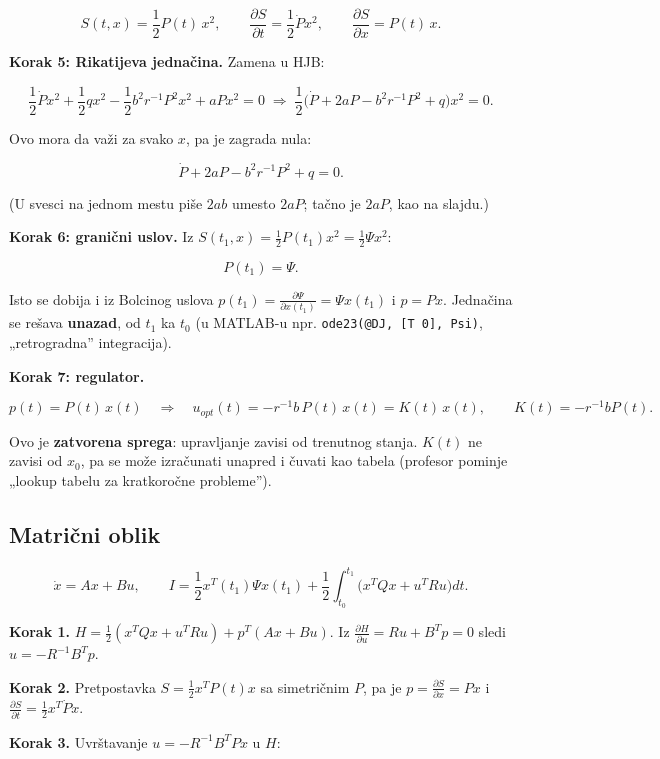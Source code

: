 \documentclass[11pt,a4paper,parskip=half,headsepline,numbers=noenddot]{scrartcl}
\begin{document}
\[S(t, x) = \frac12P(t)\,x^2, \qquad \frac{\partial S}{\partial t} = \frac12\dot P x^2, \qquad \frac{\partial S}{\partial x} = P(t)\,x .\]

\textbf{Korak 5: Rikatijeva jednačina.} Zamena u HJB:

\[\frac12\dot Px^2 + \frac12qx^2 - \frac12b^2r^{-1}P^2x^2 + aPx^2 = 0 \;\Rightarrow\; \frac12\big(\dot P + 2aP - b^2r^{-1}P^2 + q\big)x^2 = 0 .\]

Ovo mora da važi za svako \(x\), pa je zagrada nula:

\[\dot P + 2aP - b^2r^{-1}P^2 + q = 0 .\]

(U svesci na jednom mestu piše \(2ab\) umesto \(2aP\); tačno je \(2aP\), kao na slajdu.)

\textbf{Korak 6: granični uslov.} Iz \(S(t_1, x) = \frac12P(t_1)x^2 = \frac12\Psi x^2\):

\[P(t_1) = \Psi .\]

Isto se dobija i iz Bolcinog uslova \(p(t_1) = \frac{\partial\Psi}{\partial x(t_1)} = \Psi x(t_1)\) i \(p = Px\). Jednačina se rešava \textbf{unazad}, od \(t_1\) ka \(t_0\) (u MATLAB-u npr. \texttt{ode23(\allowbreak{}@DJ,\allowbreak{}\ {[}T\ 0{]},\allowbreak{}\ Psi)}, „retrogradna'' integracija).

\textbf{Korak 7: regulator.}

\[p(t) = P(t)\,x(t) \quad\Rightarrow\quad u_{opt}(t) = -r^{-1}b\,P(t)\,x(t) = K(t)\,x(t), \qquad K(t) = -r^{-1}bP(t) .\]

Ovo je \textbf{zatvorena sprega}: upravljanje zavisi od trenutnog stanja. \(K(t)\) ne zavisi od \(x_0\), pa se može izračunati unapred i čuvati kao tabela (profesor pominje „lookup tabelu za kratkoročne probleme'').

\subsection{Matrični oblik}

\[\dot x = Ax + Bu, \qquad I = \frac12x^T(t_1)\Psi x(t_1) + \frac12\int_{t_0}^{t_1}\big(x^TQx + u^TRu\big)dt .\]

\textbf{Korak 1.} \(H = \frac12(x^TQx + u^TRu) + p^T(Ax + Bu)\). Iz \(\frac{\partial H}{\partial u} = Ru + B^Tp = 0\) sledi \(u = -R^{-1}B^Tp\).

\textbf{Korak 2.} Pretpostavka \(S = \frac12x^TP(t)x\) sa simetričnim \(P\), pa je \(p = \frac{\partial S}{\partial x} = Px\) i \(\frac{\partial S}{\partial t} = \frac12x^T\dot Px\).

\textbf{Korak 3.} Uvrštavanje \(u = -R^{-1}B^TPx\) u \(H\):
\end{document}
